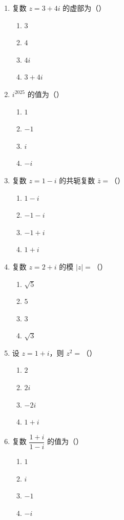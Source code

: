 \documentclass[12pt, a4paper]{ctexart}
\begin{document}
\begin{enumerate}
\item 复数 $z=3+4i$ 的虚部为（\quad）
  \begin{enumerate}[label=\Alph*., itemsep=0pt]
    \item $3$ \quad \item $4$ \quad \item $4i$ \quad \item $3+4i$
  \end{enumerate}

\item $i^{2025}$ 的值为（\quad）
  \begin{enumerate}[label=\Alph*., itemsep=0pt]
    \item $1$ \quad \item $-1$ \quad \item $i$ \quad \item $-i$
  \end{enumerate}

\item 复数 $z=1-i$ 的共轭复数 $\bar{z}=$（\quad）
  \begin{enumerate}[label=\Alph*., itemsep=0pt]
    \item $1-i$ \quad \item $-1-i$ \quad \item $-1+i$ \quad \item $1+i$
  \end{enumerate}

\item 复数 $z=2+i$ 的模 $|z|=$（\quad）
  \begin{enumerate}[label=\Alph*., itemsep=0pt]
    \item $\sqrt{5}$ \quad \item $5$ \quad \item $3$ \quad \item $\sqrt{3}$
  \end{enumerate}

\item 设 $z=1+i$，则 $z^2=$（\quad）
  \begin{enumerate}[label=\Alph*., itemsep=0pt]
    \item $2$ \quad \item $2i$ \quad \item $-2i$ \quad \item $1+i$
  \end{enumerate}

\item 复数 $\dfrac{1+i}{1-i}$ 的值为（\quad）
  \begin{enumerate}[label=\Alph*., itemsep=0pt]
    \item $1$ \quad \item $i$ \quad \item $-1$ \quad \item $-i$
  \end{enumerate}


\end{enumerate}
\end{document}
